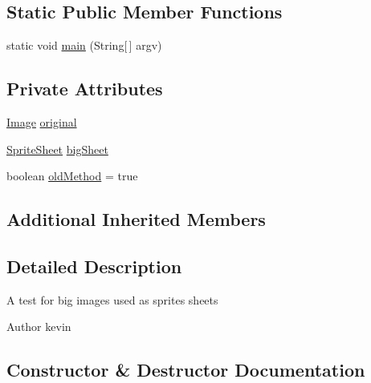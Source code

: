 \subsection*{Static Public Member Functions}
\begin{DoxyCompactItemize}
\item 
static void \mbox{\hyperlink{classorg_1_1newdawn_1_1slick_1_1tests_1_1_big_sprite_sheet_test_a4bff0fcaf8adbcbe31ccaa26253f68ad}{main}} (String\mbox{[}$\,$\mbox{]} argv)
\end{DoxyCompactItemize}
\subsection*{Private Attributes}
\begin{DoxyCompactItemize}
\item 
\mbox{\hyperlink{classorg_1_1newdawn_1_1slick_1_1_image}{Image}} \mbox{\hyperlink{classorg_1_1newdawn_1_1slick_1_1tests_1_1_big_sprite_sheet_test_a861b104e8a265dc23a36e0a55e8d368e}{original}}
\item 
\mbox{\hyperlink{classorg_1_1newdawn_1_1slick_1_1_sprite_sheet}{Sprite\+Sheet}} \mbox{\hyperlink{classorg_1_1newdawn_1_1slick_1_1tests_1_1_big_sprite_sheet_test_a676326fb3aeb2466aed58dc794d5bb66}{big\+Sheet}}
\item 
boolean \mbox{\hyperlink{classorg_1_1newdawn_1_1slick_1_1tests_1_1_big_sprite_sheet_test_a387c33f1a35dd5534111efcb232d32d9}{old\+Method}} = true
\end{DoxyCompactItemize}
\subsection*{Additional Inherited Members}


\subsection{Detailed Description}
A test for big images used as sprites sheets

\begin{DoxyAuthor}{Author}
kevin 
\end{DoxyAuthor}


\subsection{Constructor \& Destructor Documentation}
\mbox{\label{classorg_1_1newdawn_1_1slick_1_1tests_1_1_big_sprite_sheet_test_a28504a9e1d9794c3ba13049975bc25a6}} 
